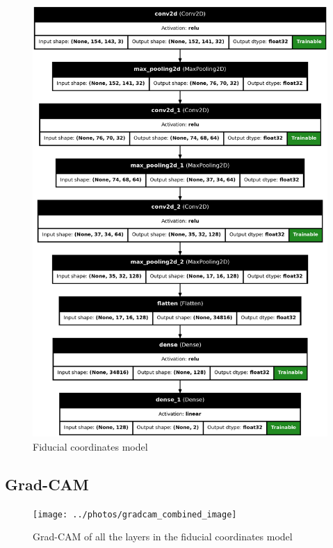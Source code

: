 \begin{figure}[H]
    \centering
    \includegraphics[height=.8\paperheight]{../photos/fiducial_coords_model}
    \caption[originalRainbow]{Fiducial coordinates model}
    \label{fig:fiducial_coords_model}
\end{figure}
\newpage

\subsection{Grad-CAM}\label{subsec:gradcam}
\begin{figure}[!ht]
    \centering
    \texttt{[image: ../photos/gradcam\_combined\_image]}
    \caption[originalRainbow]{Grad-CAM of all the layers in the fiducial coordinates model}
    \label{fig:gradcam}
\end{figure}


